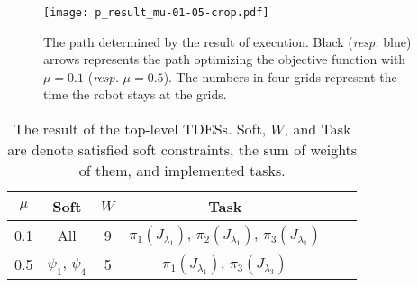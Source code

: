 \documentclass[journal,twoside,web]{IEEEtran}
\begin{document}
\begin{figure}
   \centering
   \texttt{[image: p\_result\_mu-01-05-crop.pdf]}
   \caption{The path determined by the result of execution. Black ({\sl resp.} blue) arrows represents the path optimizing the objective function with $\mu=0.1$ ({\sl resp.} $\mu=0.5$). The numbers in four grids represent the time the robot stays at the grids.}
    \label{p:result}
\end{figure}
%
%
\begin{table}
\caption{The result of the top-level TDESs. Soft, $W$, and Task are denote satisfied soft constraints, the sum of weights of them, and implemented tasks.}
\label{tab:p}
\centering
\begin{tabular}{c|c|c|ccc}
 $\mu$ &Soft& $W$&Task\\\hline
0.1& All &9 &  $\pi_1(J_{\lambda_1})$, $\pi_2(J_{\lambda_1})$, $\pi_3(J_{\lambda_1})$\\
0.5& $\psi_1$, $\psi_4$  &5 & $\pi_1(J_{\lambda_1})$, $\pi_3(J_{\lambda_3})$\\
\end{tabular}
\end{table}
%
%
\end{document}
